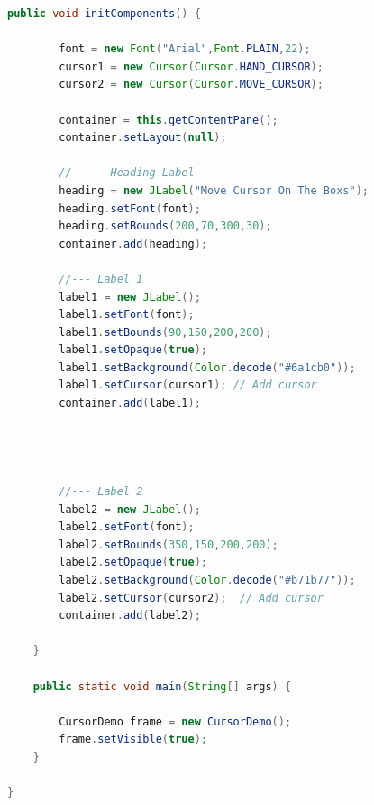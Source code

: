 \begin{frame}
\begin{lstlisting}[language=java]
	public void initComponents() {
		
		font = new Font("Arial",Font.PLAIN,22);
		cursor1 = new Cursor(Cursor.HAND_CURSOR);
		cursor2 = new Cursor(Cursor.MOVE_CURSOR);
		
		container = this.getContentPane();
		container.setLayout(null);
		
		//----- Heading Label
		heading = new JLabel("Move Cursor On The Boxs");
		heading.setFont(font);
		heading.setBounds(200,70,300,30);
		container.add(heading);
		
		//--- Label 1
		label1 = new JLabel();
		label1.setFont(font);
		label1.setBounds(90,150,200,200);
		label1.setOpaque(true);
		label1.setBackground(Color.decode("#6a1cb0"));
		label1.setCursor(cursor1); // Add cursor
		container.add(label1);
		
		
		
		
		//--- Label 2
		label2 = new JLabel();
		label2.setFont(font);
		label2.setBounds(350,150,200,200);
		label2.setOpaque(true);
		label2.setBackground(Color.decode("#b71b77"));
		label2.setCursor(cursor2);	// Add cursor
		container.add(label2);
		
	}

	public static void main(String[] args) {
		
		CursorDemo frame = new CursorDemo();
		frame.setVisible(true);
	}

}
\end{lstlisting}

\end{frame}


